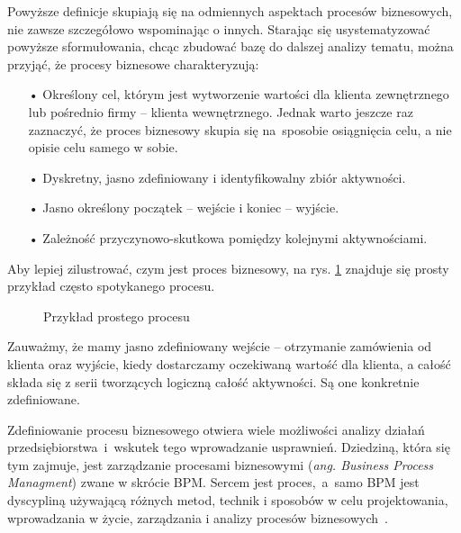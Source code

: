 Powyższe definicje skupiają się na odmiennych aspektach procesów biznesowych, nie zawsze szczegółowo wspominając o innych. Starając się usystematyzować powyższe sformułowania, chcąc zbudować bazę do dalszej analizy tematu, można przyjąć, że procesy biznesowe charakteryzują:
\begin{itemize}
  \item[•] Określony cel, którym jest wytworzenie wartości dla klienta zewnętrznego lub pośrednio firmy -- klienta wewnętrznego. Jednak warto jeszcze raz zaznaczyć, że proces biznesowy skupia się na~sposobie osiągnięcia celu, a nie opisie celu samego w sobie. 
  \item[•] Dyskretny, jasno zdefiniowany i identyfikowalny zbiór aktywności. 
  \item[•] Jasno określony początek -- wejście i koniec -- wyjście.
  \item[•] Zależność przyczynowo-skutkowa pomiędzy kolejnymi aktywnościami.
\end{itemize}

Aby lepiej zilustrować, czym jest proces biznesowy, na rys. \ref{fig:simple_business_process} znajduje się prosty przykład często spotykanego procesu.

\begin{figure}[H]
	\caption{\label{fig:simple_business_process}Przykład prostego procesu}
\end{figure}

Zauważmy, że mamy jasno zdefiniowany wejście -- otrzymanie zamówienia od klienta oraz wyjście, kiedy dostarczamy oczekiwaną wartość dla klienta, a całość składa się z serii tworzących logiczną całość aktywności. Są one konkretnie zdefiniowane.

Zdefiniowanie procesu biznesowego otwiera wiele możliwości analizy działań przedsiębiorstwa~i~wskutek tego wprowadzanie usprawnień. Dziedziną, która się tym zajmuje, jest zarządzanie procesami biznesowymi (\textit{ang. Business Process Managment}) zwane w skrócie BPM. Sercem jest proces,~a~samo BPM jest dyscypliną używającą różnych metod, technik i sposobów w celu projektowania, wprowadzania w życie, zarządzania i analizy procesów biznesowych~\cite{BPMDemystified}. 

